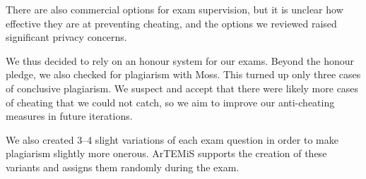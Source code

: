 There are also commercial options for exam supervision,
but it is unclear how effective they are at preventing cheating, and the options we reviewed raised significant privacy concerns.

We thus decided to rely on an honour system for our exams.
Beyond the honour pledge,
we also checked for plagiarism with Moss.
This turned up only three cases of conclusive plagiarism.
We suspect and accept that there were likely more cases of cheating that we could not catch,
so we aim to improve our anti-cheating measures in future iterations.

We also created 3--4 slight variations of each exam question
in order to make plagiarism slightly more onerous. ArTEMiS supports the creation of these variants and assigns them randomly during the exam.
